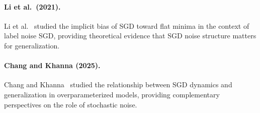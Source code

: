 \documentclass[11pt,a4paper]{article}
\theoremstyle{definition}
\theoremstyle{remark}
\begin{document}
\paragraph{Li et al.\ (2021).}
Li et al.~\cite{Li2021} studied the implicit bias of SGD toward flat minima in the
context of label noise SGD, providing theoretical evidence that SGD noise structure
matters for generalization.

\paragraph{Chang and Khanna (2025).}
Chang and Khanna~\cite{ChangKhanna2025} studied the relationship between SGD dynamics
and generalization in overparameterized models, providing complementary perspectives
on the role of stochastic noise.
\end{document}
